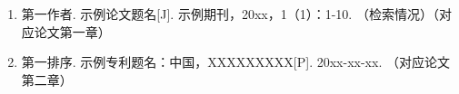 \documentclass[
  professional-degree, %
  final-cover %
]{neudissertation}
\begin{document}
\makeneucovers

\frontmatter

\makeneudeclaration

\begin{abstractcn}
  
\end{abstractcn}

\begin{abstracten}
  
\end{abstracten}

\tableofcontents

\mainmatter









\backmatter

\begin{referencescn}
  
\end{referencescn}

\begin{achievementscn}
  \begin{enumerate}
    \item 第一作者. 示例论文题名[J]. 示例期刊，20xx，1（1）：1-10. （检索情况）（对应论文第一章）
    \item 第一排序. 示例专利题名：中国，XXXXXXXXX[P]. 20xx-xx-xx. （对应论文第二章）
  \end{enumerate}
\end{achievementscn}


\end{document}
